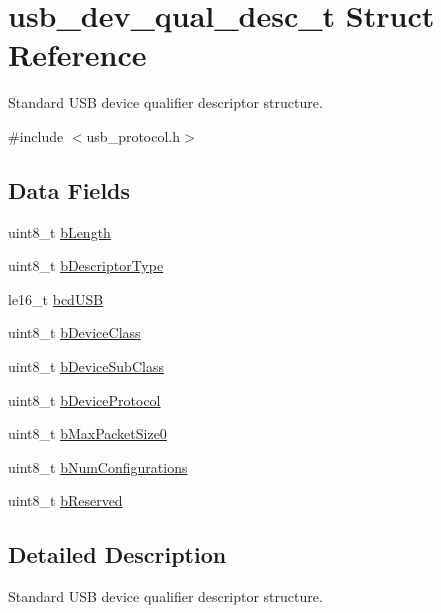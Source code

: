 \hypertarget{structusb__dev__qual__desc__t}{
\section{usb\-\_\-dev\-\_\-qual\-\_\-desc\-\_\-t \-Struct \-Reference}
\label{structusb__dev__qual__desc__t}
}


\-Standard \-U\-S\-B device qualifier descriptor structure.  




{\ttfamily \#include $<$usb\-\_\-protocol.\-h$>$}

\subsection*{\-Data \-Fields}
\begin{DoxyCompactItemize}
\item 
uint8\-\_\-t \hyperlink{structusb__dev__qual__desc__t_ac0461d921c31be2a9b10801369483735}{b\-Length}
\item 
uint8\-\_\-t \hyperlink{structusb__dev__qual__desc__t_aed758dffce7cdb50d55d5abc14616e2c}{b\-Descriptor\-Type}
\item 
le16\-\_\-t \hyperlink{structusb__dev__qual__desc__t_aaa85310913481e227da025a8b37c988f}{bcd\-U\-S\-B}
\item 
uint8\-\_\-t \hyperlink{structusb__dev__qual__desc__t_a16fd77f16bb0389ff50102288857604c}{b\-Device\-Class}
\item 
uint8\-\_\-t \hyperlink{structusb__dev__qual__desc__t_a98b076218edfb23d4f5e2bc0def61ccd}{b\-Device\-Sub\-Class}
\item 
uint8\-\_\-t \hyperlink{structusb__dev__qual__desc__t_ab6fc5f8ccf24352ff0add744af39f175}{b\-Device\-Protocol}
\item 
uint8\-\_\-t \hyperlink{structusb__dev__qual__desc__t_aacddb717f4dfcee86c5ff917c421657e}{b\-Max\-Packet\-Size0}
\item 
uint8\-\_\-t \hyperlink{structusb__dev__qual__desc__t_abc20c54ce8c80873029d9b4a3579ea4b}{b\-Num\-Configurations}
\item 
uint8\-\_\-t \hyperlink{structusb__dev__qual__desc__t_acd51487e6ef5f7c93f5e9752963b9e26}{b\-Reserved}
\end{DoxyCompactItemize}


\subsection{\-Detailed \-Description}
\-Standard \-U\-S\-B device qualifier descriptor structure. 

